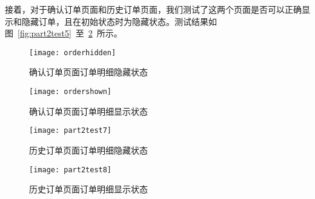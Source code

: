 接着，对于确认订单页面和历史订单页面，我们测试了这两个页面是否可以正确显示和隐藏订单，且在初始状态时为隐藏状态。测试结果如图~\ref{fig:part2test5}~至~\ref{fig:part2test8}~所示。
\begin{figure}[htbp]
    \centering
    \begin{minipage}{0.4\textwidth}
    \centering
    \texttt{[image: orderhidden]}
    \caption{确认订单页面订单明细隐藏状态}\label{fig:part2test5}
    \end{minipage}
    \begin{minipage}{0.4\textwidth}
    \centering
    \texttt{[image: ordershown]}
    \caption{确认订单页面订单明细显示状态}\label{fig:part2test6}
    \end{minipage}
    \vspace{\baselineskip}
\end{figure}
\begin{figure}[htbp]
    \centering
    \begin{minipage}{0.4\textwidth}
    \centering
    \texttt{[image: part2test7]}
    \caption{历史订单页面订单明细隐藏状态}\label{fig:part2test7}
    \end{minipage}
    \begin{minipage}{0.4\textwidth}
    \centering
    \texttt{[image: part2test8]}
    \caption{历史订单页面订单明细显示状态}\label{fig:part2test8}
    \end{minipage}
    \vspace{\baselineskip}
\end{figure}